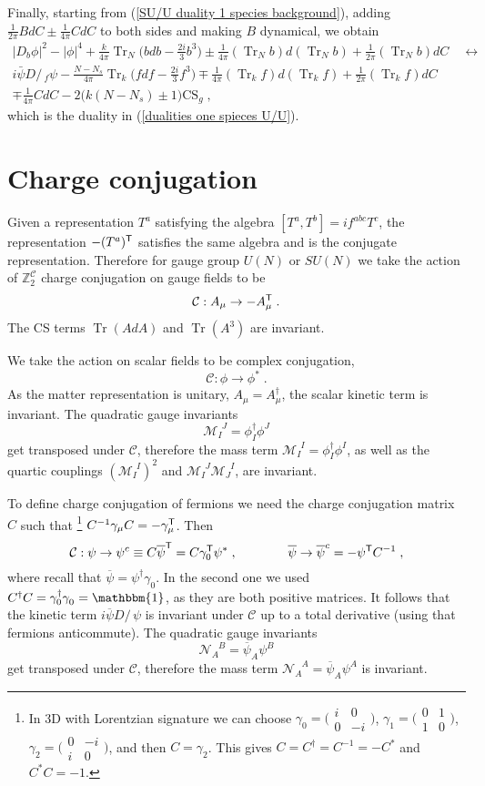 \documentclass[a4paper, 12pt]{article}
\newcommand{\du}[2]{_{#1}^{\phantom{#1}#2}}
\newcommand{\wb}{\overline}
\numberwithin{equation}{section}
\newcommand{\Dslash}{D\!\!\!\!\slash\,}
\newcommand{\smat}[1]{\big( \begin{smallmatrix} #1 \end{smallmatrix} \big)}
\newcommand{\be}{\begin{equation}} \newcommand{\ee}{\end{equation}}
\newcommand{\cC}{\mathcal{C}}
\newcommand{\cM}{\mathcal{M}}
\newcommand{\cN}{\mathcal{N}}
\newcommand{\bZ}{\mathbb{Z}}
\newcommand{\sT}{{\sf{T}}}
\newcommand{\unit}{\mathbbm{1}}
\DeclareMathOperator{\Tr}{Tr}
\begin{document}
Finally, starting from (\ref{SU/U duality 1 species background}), adding $\frac1{2\pi} BdC \pm \frac1{4\pi} CdC$ to both sides and making $B$ dynamical, we obtain
\begin{multline}
|D_b\phi|^2 - |\phi|^4 + \frac{k}{4\pi} \Tr_N \Big( bdb - \frac{2i}3 b^3 \Big) \pm \frac1{4\pi} (\Tr_N b)d(\Tr_Nb) + \frac1{2\pi} (\Tr_Nb)dC \quad\longleftrightarrow \\
i \bar\psi \Dslash_f \psi - \frac{N-N_s}{4\pi} \Tr_k \Big( fdf - \frac{2i}3 f^3 \Big) \mp \frac1{4\pi} (\Tr_k f)d(\Tr_k f) + \frac1{2\pi} (\Tr_k f) dC \\
\mp \frac1{4\pi} CdC - 2\big(k(N-N_s)\pm1\big) \text{CS}_g \;,
\end{multline}
which is the duality in (\ref{dualities one spieces U/U}).







\section{Charge conjugation}
\label{app: charge conjugation}

Given a representation $T^a$ satisfying the algebra $[T^a, T^b] = i f^{abc} T^c$, the representation $-(T^a)^\sT$ satisfies the same algebra and is the conjugate representation. Therefore for gauge group $U(N)$ or $SU(N)$ we take the action of $\bZ_2^\cC$ charge conjugation on gauge fields to be
\be
\cC: A_\mu \to - A_\mu^\sT \;.
\ee
The CS terms $\Tr(AdA)$ and $\Tr(A^3)$ are invariant.

We take the action on scalar fields to be complex conjugation,
\be
\cC: \phi \to \phi^* \;.
\ee
As the matter representation is unitary, $A_\mu = A_\mu^\dag$, the scalar kinetic term is invariant. The quadratic gauge invariants
\be
\cM\du{I}{J} = \phi^\dag_I \phi^J
\ee
get transposed under $\cC$, therefore the mass term $\cM\du{I}{I} = \phi^\dag_I \phi^I$, as well as the quartic couplings $(\cM\du{I}{I})^2$ and $\cM\du{I}{J} \cM\du{J}{I}$, are invariant.

To define charge conjugation of fermions we need the charge conjugation matrix $C$ such that%
\footnote{In 3D with Lorentzian signature we can choose $\gamma_0 = \smat{ i & 0 \\ 0 & -i}$, $\gamma_1 = \smat{0 & 1 \\ 1 & 0}$, $\gamma_2 = \smat{0 & -i \\ i & 0}$, and then $C = \gamma_2$. This gives $C = C^\dag = C^{-1} = - C^*$ and $C^*C = -1$.}
$C^{-1} \gamma_\mu C = - \gamma_\mu^\sT$. Then
\be
\cC: \psi \to \psi^c \equiv C \wb\psi^\sT = C \gamma_0^\sT \psi^* \;, \qquad\qquad \wb\psi \to \wb\psi^c = - \psi^\sT C^{-1} \;,
\ee
where recall that $\wb\psi = \psi^\dag \gamma_0$. In the second one we used $C^\dag C = \gamma_0^\dag \gamma_0^{\phantom{\dag}} = \unit$, as they are both positive matrices. It follows that the kinetic term $i\wb\psi \Dslash \psi$ is invariant under $\cC$ up to a total derivative (using that fermions anticommute). The quadratic gauge invariants
\be
\cN\du{A}{B} = \wb \psi_A \psi^B
\ee
get transposed under $\cC$, therefore the mass term $\cN\du{A}{A} = \wb\psi_A \psi^A$ is invariant.
\end{document}

